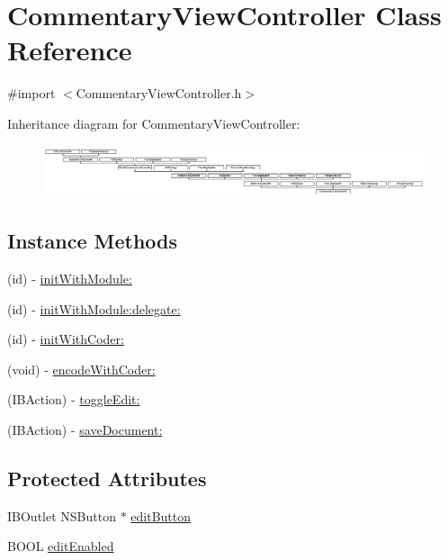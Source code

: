 \hypertarget{interface_commentary_view_controller}{\section{Commentary\-View\-Controller Class Reference}
\label{interface_commentary_view_controller}
}


{\ttfamily \#import $<$Commentary\-View\-Controller.\-h$>$}

Inheritance diagram for Commentary\-View\-Controller\-:\begin{figure}[H]
\begin{center}
\leavevmode
\includegraphics[height=1.527273cm]{interface_commentary_view_controller}
\end{center}
\end{figure}
\subsection*{Instance Methods}
\begin{DoxyCompactItemize}
\item 
(id) -\/ \hyperlink{interface_commentary_view_controller_a99a929e343d947da053f262587ac3d4e}{init\-With\-Module\-:}
\item 
(id) -\/ \hyperlink{interface_commentary_view_controller_a5f35d6147a206474914a5776133a7150}{init\-With\-Module\-:delegate\-:}
\item 
(id) -\/ \hyperlink{interface_commentary_view_controller_a6cf57c30ef62d8a0b74eafd74d0f8b39}{init\-With\-Coder\-:}
\item 
(void) -\/ \hyperlink{interface_commentary_view_controller_a958c5e82e2f22a1a132161999b5d1704}{encode\-With\-Coder\-:}
\item 
(I\-B\-Action) -\/ \hyperlink{interface_commentary_view_controller_ad7b2dedb11f071e22d7a0bb86174228d}{toggle\-Edit\-:}
\item 
(I\-B\-Action) -\/ \hyperlink{interface_commentary_view_controller_a45430eaab48bfbe503fccc999ace2687}{save\-Document\-:}
\end{DoxyCompactItemize}
\subsection*{Protected Attributes}
\begin{DoxyCompactItemize}
\item 
I\-B\-Outlet N\-S\-Button $\ast$ \hyperlink{interface_commentary_view_controller_a5c1a02e85f2ce3f7c084b9af4cadca69}{edit\-Button}
\item 
B\-O\-O\-L \hyperlink{interface_commentary_view_controller_a866b1fb4966c03f59bc92fbc5f39139c}{edit\-Enabled}
\end{DoxyCompactItemize}
